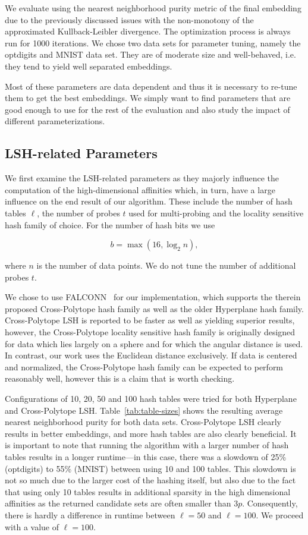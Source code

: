 We evaluate using the nearest neighborhood purity metric of the final embedding
due to the previously discussed issues with the non-monotony of the approximated
Kullback-Leibler divergence. The optimization process is always run for \num{1000}
iterations. We chose two data sets for parameter tuning, namely the optdigits and
MNIST data set. They are of moderate size and well-behaved, i.e. they tend to yield
well separated embeddings.

Most of these parameters are data dependent and thus it is necessary to re-tune
them to get the best embeddings. We simply want to find parameters that are
good enough to use for the rest of the evaluation and also study the impact of
different parameterizations.

\subsection{LSH-related Parameters}

We first examine the LSH-related parameters as they majorly influence the computation
of the high-dimensional affinities which, in turn, have a large influence on the end
result of our algorithm. These include the number of hash tables $\ell$, the number of probes $t$
used for multi-probing and the locality sensitive hash family of choice. For the number
of hash bits we use

\begin{equation*}
  b = \max( 16, \log_2 n ),
\end{equation*}

where $n$ is the number of data points. We do not tune the number of additional probes $t$.

We chose to use FALCONN~\cite{falconn} for our implementation, which supports
the therein proposed Cross-Polytope hash family as well as the older Hyperplane
hash family. Cross-Polytope LSH is reported to be faster as well as yielding
superior results, however, the Cross-Polytope locality sensitive hash family is
originally designed for data which lies largely on a sphere and for which the
angular distance is used. In contrast, our work uses the Euclidean distance
exclusively. If data is centered and normalized, the Cross-Polytope hash family
can be expected to perform reasonably well, however this is a claim that is
worth checking.

Configurations of 10, 20, 50 and 100 hash tables were tried for both Hyperplane and
Cross-Polytope LSH. Table~\ref{tab:table-sizes} shows the resulting average
nearest neighborhood purity for both data sets. Cross-Polytope LSH clearly
results in better embeddings, and more hash tables are also clearly beneficial.
It is important to note that running the algorithm with a larger number of hash
tables results in a longer runtime---in this case, there was a slowdown of 25\%
(optdigits) to 55\% (MNIST) between using 10 and 100 tables. This slowdown is
not so much due to the larger cost of the hashing itself, but also due to the
fact that using only 10 tables results in additional sparsity in the high
dimensional affinities as the returned candidate sets are often smaller than
$3p$. Consequently, there is hardly a difference in runtime between $\ell = 50$
and $\ell = 100$. We proceed with a value of $\ell = 100$.

